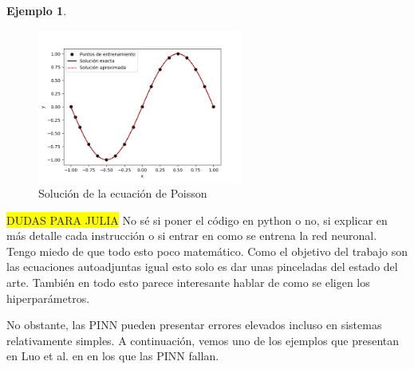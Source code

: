 \documentclass[a4paper,11pt,spanish, twoside, leqno]{tfg-uam}
\theoremstyle{definition}
\newtheorem{exmp}[teor]{Ejemplo}
\begin{document}
\begin{mdframed}
\begin{exmp}
    \begin{figure}[H] 
        \centering
        \includegraphics[width=0.6\textwidth]{Figuras/Poisson.png}
        \caption{Solución de la ecuación de Poisson}
        \label{fig:poisson_PINN}
    \end{figure}

    \colorbox{yellow}{DUDAS PARA JULIA}
    No sé si poner el código en python o no, si explicar en más detalle cada instrucción o si entrar en como se entrena la red neuronal. Tengo miedo de que todo esto poco matemático. Como el objetivo del trabajo son las ecuaciones autoadjuntas igual esto solo es dar unas pinceladas del estado del arte. También en todo esto parece interesante hablar de como se eligen los hiperparámetros.

\end{exmp}
\end{mdframed}

No obstante, las PINN pueden presentar errores elevados incluso en sistemas relativamente simples. A continuación, vemos uno de los ejemplos que presentan en Luo et al. en \cite{luo2023residualminimizationpdesfailure} en los que las PINN fallan.
\end{document}
